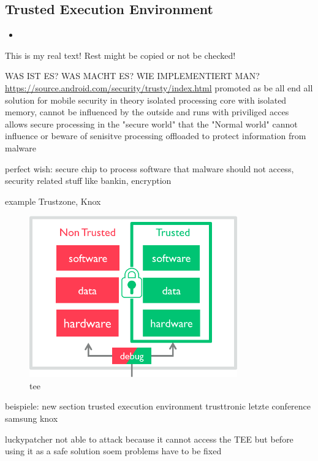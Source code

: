 \subsection{Trusted Execution Environment} \label{section:counter-external-tee}
\begin{itemize}
  \item
\end{itemize}
This is my real text! Rest might be copied or not be checked!

WAS IST ES?
WAS MACHT ES?
WIE IMPLEMENTIERT MAN?
\url{https://source.android.com/security/trusty/index.html}
%
promoted as be all end all solution for mobile security
in theory isolated processing core with isolated memory, cannot be influenced by the outside and runs with priviliged acces
allows secure processing in the "secure world" that the "Normal world" cannot influence or beware of
senisitve processing offloaded to protect information from malware

perfect wish:
secure chip to process software that malware should not access, security related stuff like bankin, encryption

example Trustzone, Knox
\begin{figure}[h]
    \centering
    \includegraphics[width=0.8\textwidth]{data/tee.png}
    \caption{tee \cite{armTz}}
    \label{fig:tee}
\end{figure}


\cite{dragonTZ}\cite{armTz}
%



beispiele:
new section trusted execution environment
trusttronic letzte conference
samsung knox


luckypatcher not able to attack because it cannot access the TEE but before using it as a safe solution soem problems have to be fixed


